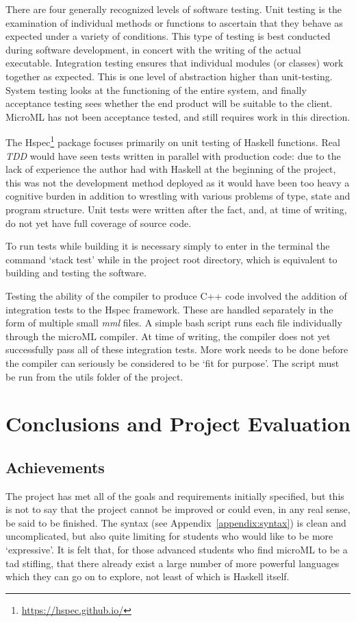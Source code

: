 \documentclass[12pt, a4paper]{report}
\begin{document}
There are four generally recognized levels of software testing. Unit testing is the examination of
individual methods or functions to ascertain that they behave as expected under a variety of
conditions. This type of testing is best conducted during software development, in concert with the
writing of the actual executable. Integration testing ensures that individual modules (or
classes) work together as expected. This is one level of abstraction higher than unit-testing.
System testing looks at the functioning of the entire system, and finally acceptance testing sees
whether the end product will be suitable to the client. MicroML has not been acceptance tested, and
still requires work in this direction.

The Hspec\footnote{\url{https://hspec.github.io/}} package focuses primarily on unit testing of
Haskell functions. Real \textit{TDD} would have seen tests written in parallel with production code:
due to the lack of experience the author had with Haskell at the beginning of the project, this was
not the development method deployed as it would have been too heavy a cognitive burden in addition
to wrestling with various problems of type, state and program structure. Unit tests were written
after the fact, and, at time of writing, do not yet have full coverage of source code.

To run tests while building it is necessary simply to enter in the terminal the command `stack test'
while in the project root directory, which is equivalent to building and testing the
software.

Testing the ability of the compiler to produce C++ code involved the addition of integration tests
to the Hspec framework. These are handled separately in the form of multiple small \textit{mml}
files. A simple bash script runs each file individually through the microML compiler. At time of
writing, the compiler does not yet successfully pass all of these integration tests. More work needs
to be done before the compiler can seriously be considered to be `fit for purpose'. The script must
be run from the utils folder of the project.

\chapter{Conclusions and Project Evaluation}

\section{Achievements}
The project has met all of the goals and requirements initially specified, but this is not to say
that the project cannot be improved or could even, in any real sense, be said to be finished. The
syntax (see Appendix~\ref{appendix:syntax}) is clean and uncomplicated, but also quite limiting for
students who would like to be more `expressive'. It is felt that, for those advanced students who
find microML to be a tad stifling, that there already exist a large number of more powerful languages
which they can go on to explore, not least of which is Haskell itself. 
\end{document}
